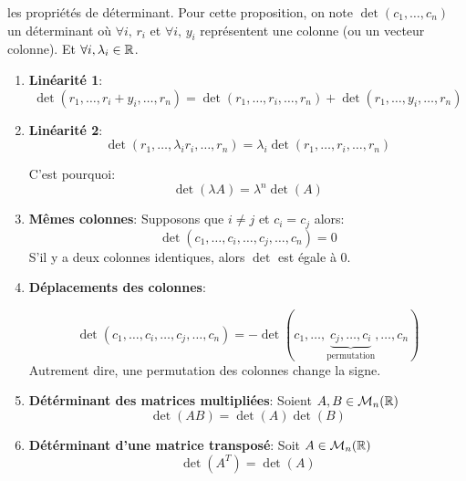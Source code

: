 \begin{prop} les propriétés de déterminant.
    Pour cette proposition, on note $\det(c_1, \ldots, c_n)$ un déterminant où $\forall i, \, r_i$ et $\forall i, \, y_i$ représentent une colonne (ou un vecteur colonne). Et $\forall i, \lambda_i \in \mathbb{R}$.
    \begin{enumerate}
        \item \textbf{Linéarité 1}:
            \[
            \det(r_1, \ldots, r_i + y_i, \ldots, r_n) = \det(r_1, \ldots, r_i, \ldots, r_n) + \det(r_1, \ldots, y_i, \ldots, r_n)
            \] 
        \item \textbf{Linéarité 2}:
            \[
            \det(r_1, \ldots, \lambda_ir_i, \ldots, r_n) = \lambda_i\det(r_1, \ldots, r_i, \ldots, r_n) 
            \] 
            \begin{note}
               C'est pourquoi:
               \[
               \det(\lambda A) = \lambda^n\det(A)
               \] 
            \end{note}
        \item \textbf{Mêmes colonnes}: Supposons que $i \neq j$ et $c_i = c_j$ alors:
             \[
            \det(c_1, \ldots, c_i, \ldots, c_j, \ldots, c_n) = 0
            \] 
            S'il y a deux colonnes identiques, alors $\det$ est égale à 0.
        \item \textbf{Déplacements des colonnes}:
            
\[
    \det(c_1, \ldots, c_i, \ldots, c_j, \ldots, c_n) 
    = -\det(c_1, \ldots, 
    \underbrace{c_j , \ldots, 
    c_i}_{\text{permutation}}, \ldots, c_n)
\]
Autrement dire, une permutation des colonnes change la signe.

\item \textbf{Détérminant des matrices multipliées}: Soient $A, B \in \mathcal{M}_n(\mathbb{R})$
    \[
        \det(AB) = \det(A)\det(B) 
    \] 

\item \textbf{Détérminant d'une matrice transposé}: Soit $A \in \mathcal{M}_n(\mathbb{R})$
    \[
        \det(A^{T}) = \det(A)
    \] 


\end{enumerate}
\end{prop}
